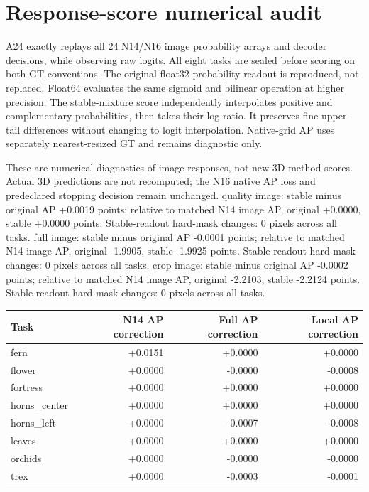 \section{Response-score numerical audit}
A24 exactly replays all 24 N14/N16 image probability arrays and decoder decisions, while observing raw logits. All eight tasks are sealed before scoring on both GT conventions. The original float32 probability readout is reproduced, not replaced. Float64 evaluates the same sigmoid and bilinear operation at higher precision. The stable-mixture score independently interpolates positive and complementary probabilities, then takes their log ratio. It preserves fine upper-tail differences without changing to logit interpolation. Native-grid AP uses separately nearest-resized GT and remains diagnostic only.
\begin{center}\small\end{center}
These are numerical diagnostics of image responses, not new 3D method scores. Actual 3D predictions are not recomputed; the N16 native AP loss and predeclared stopping decision remain unchanged.
quality image: stable minus original AP +0.0019 points; relative to matched N14 image AP, original +0.0000, stable +0.0000 points. Stable-readout hard-mask changes: 0 pixels across all tasks.
full image: stable minus original AP -0.0001 points; relative to matched N14 image AP, original -1.9905, stable -1.9925 points. Stable-readout hard-mask changes: 0 pixels across all tasks.
crop image: stable minus original AP -0.0002 points; relative to matched N14 image AP, original -2.2103, stable -2.2124 points. Stable-readout hard-mask changes: 0 pixels across all tasks.
\begin{center}\small\begin{tabular}{lrrr}\toprule
Task & N14 AP correction & Full AP correction & Local AP correction \\\midrule
fern & +0.0151 & +0.0000 & +0.0000 \\
flower & +0.0000 & -0.0000 & -0.0008 \\
fortress & +0.0000 & +0.0000 & +0.0000 \\
horns\_center & +0.0000 & +0.0000 & +0.0000 \\
horns\_left & +0.0000 & -0.0007 & -0.0008 \\
leaves & +0.0000 & +0.0000 & +0.0000 \\
orchids & +0.0000 & -0.0000 & -0.0000 \\
trex & +0.0000 & -0.0003 & -0.0001 \\
\bottomrule\end{tabular}\end{center}
